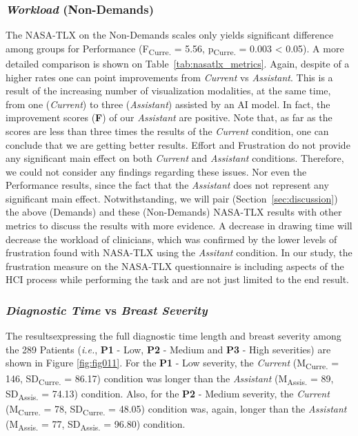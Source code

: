 \subsubsection{{\it Workload} (Non-Demands)}

The NASA-TLX on the Non-Demands scales only yields significant difference among groups for Performance (F\textsubscript{Curre.} = 5.56, p\textsubscript{Curre.} = 0.003 < 0.05).
A more detailed comparison is shown on Table~\ref{tab:nasatlx_metrics}.
Again, despite of a higher rates one can point improvements from {\it Current} vs {\it Assistant}.
This is a result of the increasing number of visualization modalities, at the same time, from one ({\it Current}) to three ({\it Assistant}) assisted by an AI model.
In fact, the improvement scores (\textbf{F}) of our {\it Assistant} are positive.
Note that, as far as the scores are less than three times the results of the {\it Current} condition, one can conclude that we are getting better results.
Effort and Frustration do not provide any significant main effect on both {\it Current} and {\it Assistant} conditions.
Therefore, we could not consider any findings regarding these issues.
Nor even the Performance results, since the fact that the {\it Assistant} does not represent any significant main effect.
Notwithstanding, we will pair (Section~\ref{sec:discussion}) the above (Demands) and these (Non-Demands) NASA-TLX results with other metrics to discuss the results with more evidence.
A decrease in drawing time will decrease the workload of clinicians, which was confirmed by the lower levels of frustration found with NASA-TLX using the {\it Assitant} condition.
In our study, the frustration measure on the NASA-TLX questionnaire is including aspects of the HCI process while performing the task and are not just limited to the end result.



\subsubsection{{\it Diagnostic Time} vs {\it Breast Severity}}

The results\footnotemark[13] expressing the full diagnostic time length and breast severity among the 289 Patients ({\em i.e.}, {\bf P1} - Low, {\bf P2} - Medium and {\bf P3} - High severities) are shown in Figure \ref{fig:fig011}.
For the {\bf P1} - Low severity, the {\it Current} (M\textsubscript{Curre.} = 146, SD\textsubscript{Curre.} = 86.17) condition was longer than the {\it Assistant} (M\textsubscript{Assis.} = 89, SD\textsubscript{Assis.} = 74.13) condition.
Also, for the {\bf P2} - Medium severity, the {\it Current} (M\textsubscript{Curre.} = 78, SD\textsubscript{Curre.} = 48.05) condition was, again, longer than the {\it Assistant} (M\textsubscript{Assis.} = 77, SD\textsubscript{Assis.} = 96.80) condition.

